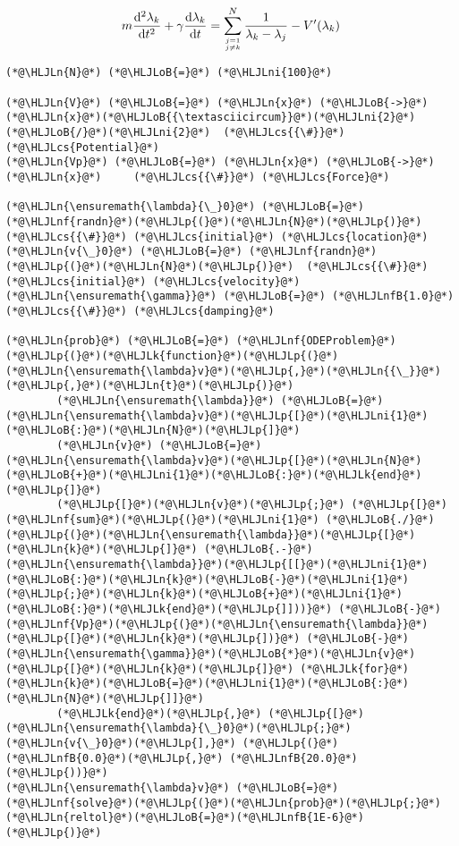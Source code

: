\documentclass[12pt,a4paper]{article}
\newcommand{\HLJLk}[1]{\textcolor[RGB]{148,91,176}{\textbf{#1}}}
\newcommand{\HLJLn}[1]{#1}
\newcommand{\HLJLnf}[1]{\textcolor[RGB]{66,102,213}{#1}}
\newcommand{\HLJLnfB}[1]{\textcolor[RGB]{59,151,46}{#1}}
\newcommand{\HLJLni}[1]{\textcolor[RGB]{59,151,46}{#1}}
\newcommand{\HLJLoB}[1]{\textcolor[RGB]{102,102,102}{\textbf{#1}}}
\newcommand{\HLJLp}[1]{#1}
\newcommand{\HLJLcs}[1]{\textcolor[RGB]{153,153,119}{\textit{#1}}}
\def\D{ {\rm d} }
\def\dt{\D t}
\begin{document}
\begin{align*}
m {\D^2 \lambda_k \over \D t^2} + \gamma {\D \lambda_k \over \dt}  =
    \sum_{j=1 \atop j \neq k}^N {1 \over \lambda_k -\lambda_j} - V'(\lambda_k)
\end{align*}

\begin{lstlisting}
(*@\HLJLn{N}@*) (*@\HLJLoB{=}@*) (*@\HLJLni{100}@*)

(*@\HLJLn{V}@*) (*@\HLJLoB{=}@*) (*@\HLJLn{x}@*) (*@\HLJLoB{->}@*) (*@\HLJLn{x}@*)(*@\HLJLoB{{\textasciicircum}}@*)(*@\HLJLni{2}@*)(*@\HLJLoB{/}@*)(*@\HLJLni{2}@*)  (*@\HLJLcs{{\#}}@*) (*@\HLJLcs{Potential}@*)
(*@\HLJLn{Vp}@*) (*@\HLJLoB{=}@*) (*@\HLJLn{x}@*) (*@\HLJLoB{->}@*) (*@\HLJLn{x}@*)     (*@\HLJLcs{{\#}}@*) (*@\HLJLcs{Force}@*)

(*@\HLJLn{\ensuremath{\lambda}{\_}0}@*) (*@\HLJLoB{=}@*) (*@\HLJLnf{randn}@*)(*@\HLJLp{(}@*)(*@\HLJLn{N}@*)(*@\HLJLp{)}@*)  (*@\HLJLcs{{\#}}@*) (*@\HLJLcs{initial}@*) (*@\HLJLcs{location}@*)
(*@\HLJLn{v{\_}0}@*) (*@\HLJLoB{=}@*) (*@\HLJLnf{randn}@*)(*@\HLJLp{(}@*)(*@\HLJLn{N}@*)(*@\HLJLp{)}@*)  (*@\HLJLcs{{\#}}@*) (*@\HLJLcs{initial}@*) (*@\HLJLcs{velocity}@*)
(*@\HLJLn{\ensuremath{\gamma}}@*) (*@\HLJLoB{=}@*) (*@\HLJLnfB{1.0}@*)    (*@\HLJLcs{{\#}}@*) (*@\HLJLcs{damping}@*)

(*@\HLJLn{prob}@*) (*@\HLJLoB{=}@*) (*@\HLJLnf{ODEProblem}@*)(*@\HLJLp{(}@*)(*@\HLJLk{function}@*)(*@\HLJLp{(}@*)(*@\HLJLn{\ensuremath{\lambda}v}@*)(*@\HLJLp{,}@*)(*@\HLJLn{{\_}}@*)(*@\HLJLp{,}@*)(*@\HLJLn{t}@*)(*@\HLJLp{)}@*)
        (*@\HLJLn{\ensuremath{\lambda}}@*) (*@\HLJLoB{=}@*) (*@\HLJLn{\ensuremath{\lambda}v}@*)(*@\HLJLp{[}@*)(*@\HLJLni{1}@*)(*@\HLJLoB{:}@*)(*@\HLJLn{N}@*)(*@\HLJLp{]}@*)
        (*@\HLJLn{v}@*) (*@\HLJLoB{=}@*) (*@\HLJLn{\ensuremath{\lambda}v}@*)(*@\HLJLp{[}@*)(*@\HLJLn{N}@*)(*@\HLJLoB{+}@*)(*@\HLJLni{1}@*)(*@\HLJLoB{:}@*)(*@\HLJLk{end}@*)(*@\HLJLp{]}@*)
        (*@\HLJLp{[}@*)(*@\HLJLn{v}@*)(*@\HLJLp{;}@*) (*@\HLJLp{[}@*)(*@\HLJLnf{sum}@*)(*@\HLJLp{(}@*)(*@\HLJLni{1}@*) (*@\HLJLoB{./}@*) (*@\HLJLp{(}@*)(*@\HLJLn{\ensuremath{\lambda}}@*)(*@\HLJLp{[}@*)(*@\HLJLn{k}@*)(*@\HLJLp{]}@*) (*@\HLJLoB{.-}@*) (*@\HLJLn{\ensuremath{\lambda}}@*)(*@\HLJLp{[[}@*)(*@\HLJLni{1}@*)(*@\HLJLoB{:}@*)(*@\HLJLn{k}@*)(*@\HLJLoB{-}@*)(*@\HLJLni{1}@*)(*@\HLJLp{;}@*)(*@\HLJLn{k}@*)(*@\HLJLoB{+}@*)(*@\HLJLni{1}@*)(*@\HLJLoB{:}@*)(*@\HLJLk{end}@*)(*@\HLJLp{]]))}@*) (*@\HLJLoB{-}@*) (*@\HLJLnf{Vp}@*)(*@\HLJLp{(}@*)(*@\HLJLn{\ensuremath{\lambda}}@*)(*@\HLJLp{[}@*)(*@\HLJLn{k}@*)(*@\HLJLp{])}@*) (*@\HLJLoB{-}@*)  (*@\HLJLn{\ensuremath{\gamma}}@*)(*@\HLJLoB{*}@*)(*@\HLJLn{v}@*)(*@\HLJLp{[}@*)(*@\HLJLn{k}@*)(*@\HLJLp{]}@*) (*@\HLJLk{for}@*) (*@\HLJLn{k}@*)(*@\HLJLoB{=}@*)(*@\HLJLni{1}@*)(*@\HLJLoB{:}@*)(*@\HLJLn{N}@*)(*@\HLJLp{]]}@*)
        (*@\HLJLk{end}@*)(*@\HLJLp{,}@*) (*@\HLJLp{[}@*)(*@\HLJLn{\ensuremath{\lambda}{\_}0}@*)(*@\HLJLp{;}@*) (*@\HLJLn{v{\_}0}@*)(*@\HLJLp{],}@*) (*@\HLJLp{(}@*)(*@\HLJLnfB{0.0}@*)(*@\HLJLp{,}@*) (*@\HLJLnfB{20.0}@*)(*@\HLJLp{))}@*)
(*@\HLJLn{\ensuremath{\lambda}v}@*) (*@\HLJLoB{=}@*) (*@\HLJLnf{solve}@*)(*@\HLJLp{(}@*)(*@\HLJLn{prob}@*)(*@\HLJLp{;}@*) (*@\HLJLn{reltol}@*)(*@\HLJLoB{=}@*)(*@\HLJLnfB{1E-6}@*)(*@\HLJLp{)}@*)


\end{lstlisting}
\end{document}
